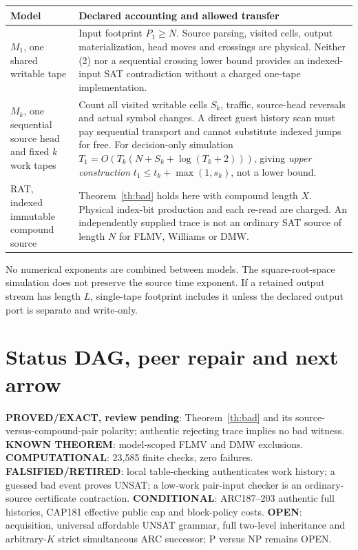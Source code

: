 \documentclass[11pt]{article}
\begin{document}
\begin{center}\small
\begin{tabularx}{.97\linewidth}{p{.17\linewidth}X}
\toprule
Model & Declared accounting and allowed transfer\\\midrule
$M_1$, one shared writable tape & Input footprint $P_1\ge N$. Source parsing, visited cells, output materialization, head moves and crossings are physical. Neither (2) nor a sequential crossing lower bound provides an indexed-input SAT contradiction without a charged one-tape implementation.\\
$M_k$, one sequential source head and fixed $k$ work tapes & Count all visited writable cells $S_k$, traffic, source-head reversals and actual symbol changes. A direct guest history scan must pay sequential transport and cannot substitute indexed jumps for free. For decision-only simulation $T_1=O(T_k(N+S_k+\log(T_k+2)))$, giving \emph{upper construction} $t_1\le t_k+\max(1,s_k)$, not a lower bound.\\
RAT, indexed immutable compound source & Theorem~\ref{th:bad} holds here with compound length $X$. Physical index-bit production and each re-read are charged. An independently supplied trace is not an ordinary SAT source of length $N$ for FLMV, Williams or DMW.\\
\bottomrule
\end{tabularx}
\end{center}
No numerical exponents are combined between models. The square-root-space simulation does not preserve the source time exponent. If a retained output stream has length $L$, single-tape footprint includes it unless the declared output port is separate and write-only.

\section{Status DAG, peer repair and next arrow}
\noindent\textbf{PROVED/EXACT, review pending}: Theorem~\ref{th:bad} and its source-versus-compound-pair polarity; authentic rejecting trace implies no bad witness. \textbf{KNOWN THEOREM}: model-scoped FLMV and DMW exclusions. \textbf{COMPUTATIONAL}: 23,585 finite checks, zero failures. \textbf{FALSIFIED/RETIRED}: local table-checking authenticates work history; a guessed bad event proves UNSAT; a low-work pair-input checker is an ordinary-source certificate contraction. \textbf{CONDITIONAL}: ARC187--203 authentic full histories, CAP181 effective public cap and block-policy costs. \textbf{OPEN}: acquisition, universal affordable UNSAT grammar, full two-level inheritance and arbitrary-$K$ strict simultaneous ARC successor; P versus NP remains OPEN.
\end{document}
